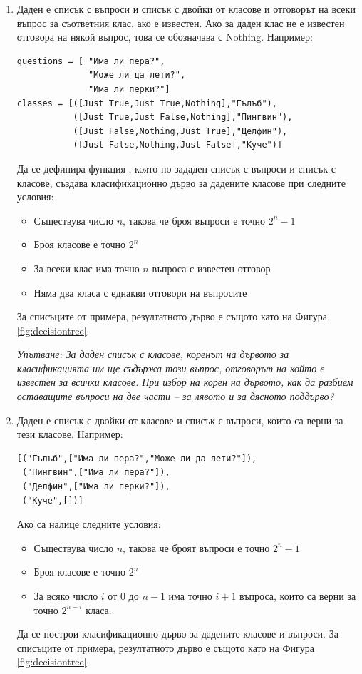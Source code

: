 \begin{enumerate}[resume]
	
	\item Даден е списък с въпроси  и списък с двойки от класове и отговорът на всеки въпрос за съответния клас, ако е известен. Ако за даден клас не е известен отговора на някой въпрос, това се обозначава с Nothing. Например:
\begin{verbatim}
questions = [ "Има ли пера?", 
              "Може ли да лети?", 
              "Има ли перки?"]
classes = [([Just True,Just True,Nothing],"Гълъб"),
           ([Just True,Just False,Nothing],"Пингвин"),
           ([Just False,Nothing,Just True],"Делфин"),
           ([Just False,Nothing,Just False],"Куче")]

\end{verbatim}
Да се дефинира функция , която по зададен списък с въпроси и списък с класове, създава класификационно дърво за дадените класове при следните условия:
\begin{itemize}
	\item Съществува число $n$, такова че броя въпроси е точно $2^n-1$
	\item Броя класове е точно $2^n$
	\item За всеки клас има точно $n$ въпроса с известен отговор
	\item Няма два класа с еднакви отговори на въпросите
\end{itemize}


За списъците от примера, резултатното дърво е същото като на Фигура \ref{fig:decisiontree}. 

\emph{Упътване: За даден списък с класове, коренът на дървото за класификацията им ще съдържа този въпрос, отговорът на който е известен за всички класове. При избор на корен на дървото, как да разбием оставащите въпроси на две части -- за лявото и за дясното поддърво?}

	\item Даден е списък с двойки от класове и списък с въпроси, които са верни за тези класове. Например:
\begin{verbatim}
[("Гълъб",["Има ли пера?","Може ли да лети?"]),
 ("Пингвин",["Има ли пера?"]),
 ("Делфин",["Има ли перки?"]),
 ("Куче",[])]
\end{verbatim}
Ако са налице следните условия:
\begin{itemize}
	\item Съществува число $n$, такова че броят въпроси е точно $2^n-1$
	\item Броя класове е точно $2^n$
	\item За всяко число $i$ от $0$ до $n-1$ има точно $i+1$ въпроса, които са верни за точно $2^{n-i}$ класа.
\end{itemize}
	Да се построи класификационно дърво за дадените класове и въпроси. За списъците от примера, резултатното дърво е същото като на Фигура \ref{fig:decisiontree}. 


\end{enumerate}
